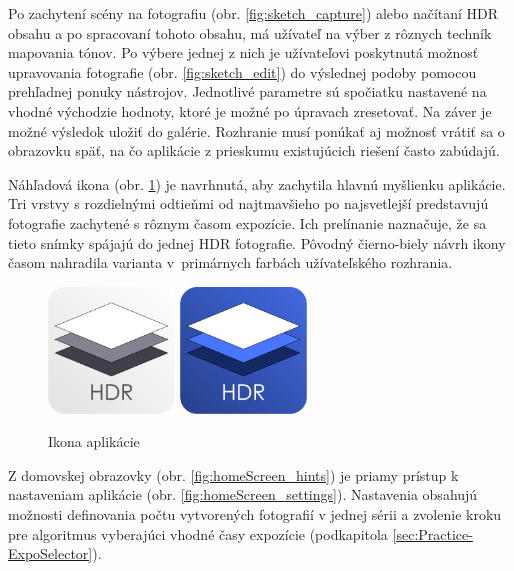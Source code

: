 Po zachytení scény na fotografiu (obr. \ref{fig:sketch_capture}) alebo načítaní HDR obsahu a po spracovaní 
tohoto obsahu, má užívateľ na výber z rôznych techník mapovania tónov. Po výbere jednej z nich je
užívateľovi poskytnutá možnosť upravovania fotografie (obr. \ref{fig:sketch_edit}) do výslednej podoby 
pomocou prehľadnej ponuky nástrojov. Jednotlivé parametre sú spočiatku nastavené na vhodné východzie 
hodnoty, ktoré je možné po úpravach zresetovať. Na záver je možné výsledok uložiť do galérie. Rozhranie 
musí ponúkať aj možnosť vrátiť sa o obrazovku späť, na čo aplikácie z prieskumu existujúcich riešení 
často zabúdajú.

Náhľadová ikona (obr. \ref{fig:appIcon}) je navrhnutá, aby zachytila hlavnú myšlienku aplikácie.
Tri vrstvy s rozdielnými odtieňmi od najtmavšieho po najsvetlejší predstavujú fotografie zachytené
s rôznym časom expozície. Ich prelínanie naznačuje, že sa tieto snímky spájajú do jednej HDR fotografie.
Pôvodný čierno-biely návrh ikony časom nahradila varianta v~primárnych farbách užívateľského rozhrania.

\begin{figure}[h!]
    \centering
    \includegraphics[width=0.3\textwidth]{figures/ui/logo/logo_bw}
    \includegraphics[width=0.3\textwidth]{figures/ui/logo/logo}
    \caption{Ikona aplikácie}
    \label{fig:appIcon}
\end{figure}

Z domovskej obrazovky (obr. \ref{fig:homeScreen_hints}) je priamy prístup k nastaveniam aplikácie (obr.
\ref{fig:homeScreen_settings}). Nastavenia obsahujú možnosti definovania počtu vytvorených fotografií
v jednej sérii a zvolenie kroku pre algoritmus vyberajúci vhodné časy expozície (podkapitola
\ref{sec:Practice-ExpoSelector}).

